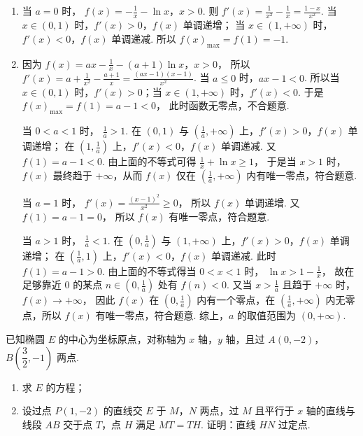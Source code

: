 \begin{solution}
\begin{enumerate}
\item 当 \(a=0\) 时，
\(f(x)=-\frac1x-\ln x\)，\(x>0\).
则
\(f'(x)=\frac{1}{x^2}-\frac1x=\frac{1-x}{x^2}\).
当 \(x\in(0,1)\) 时，\(f'(x)>0\)，\(f(x)\) 单调递增；
当 \(x\in(1,+\infty)\) 时，\(f'(x)<0\)，\(f(x)\) 单调递减.
所以
\(f(x)_{\max}=f(1)=-1\).

\item 因为
\(f(x)=ax-\frac1x-(a+1)\ln x\)，\(x>0\)，
所以
\(f'(x)=a+\frac1{x^2}-\frac{a+1}{x}=\frac{(ax-1)(x-1)}{x^2}\).
当 \(a\le0\) 时，\(ax-1<0\). 所以当 \(x\in(0,1)\) 时，\(f'(x)>0\)；当 \(x\in(1,+\infty)\) 时，\(f'(x)<0\). 于是
\(f(x)_{\max}=f(1)=a-1<0\)，
此时函数无零点，不合题意.

当 \(0<a<1\) 时，
\(\frac1a>1\).
在 \((0,1)\) 与 \(\left(\frac1a,+\infty\right)\) 上，\(f'(x)>0\)，\(f(x)\) 单调递增；
在 \(\left(1,\frac1a\right)\) 上，\(f'(x)<0\)，\(f(x)\) 单调递减.
又
\(f(1)=a-1<0\).
由上面的不等式可得
\(\frac1x+\ln x\ge1\)，
于是当 \(x>1\) 时，\(f(x)\) 最终趋于 \(+\infty\)，从而 \(f(x)\) 仅在 \(\left(\frac1a,+\infty\right)\) 内有唯一零点，符合题意.

当 \(a=1\) 时，
\(f'(x)=\frac{(x-1)^2}{x^2}\ge0\)，
所以 \(f(x)\) 单调递增. 又
\(f(1)=a-1=0\)，
所以 \(f(x)\) 有唯一零点，符合题意.

当 \(a>1\) 时，
\(\frac1a<1\).
在 \(\left(0,\frac1a\right)\) 与 \((1,+\infty)\) 上，\(f'(x)>0\)，\(f(x)\) 单调递增；
在 \(\left(\frac1a,1\right)\) 上，\(f'(x)<0\)，\(f(x)\) 单调递减.
此时
\(f(1)=a-1>0\).
由上面的不等式得当 \(0<x<1\) 时，
\(\ln x>1-\frac1x\)，
故在足够靠近 \(0\) 的某点 \(n\in\left(0,\frac1a\right)\) 处有 \(f(n)<0\). 又当 \(x>\frac1a\) 且趋于 \(+\infty\) 时，
\(f(x)\to+\infty\)，
因此 \(f(x)\) 在 \(\left(0,\frac1a\right)\) 内有一个零点，在 \(\left(\frac1a,+\infty\right)\) 内无零点，所以 \(f(x)\) 有唯一零点，符合题意.
综上，\(a\) 的取值范围为
\((0,+\infty)\).
\end{enumerate}
\end{solution}

\begin{problem}
已知椭圆 \(E\) 的中心为坐标原点，对称轴为 \(x\) 轴，\(y\) 轴，且过 \(A(0,-2)\)，\(B\left(\dfrac32,-1\right)\) 两点.

\begin{enumerate}
\item 求 \(E\) 的方程；

\item 设过点 \(P(1,-2)\) 的直线交 \(E\) 于 \(M\)，\(N\) 两点，过 \(M\) 且平行于 \(x\) 轴的直线与线段 \(AB\) 交于点 \(T\)，点 \(H\) 满足 \(MT=TH\). 证明：直线 \(HN\) 过定点.
\end{enumerate}
\end{problem}

